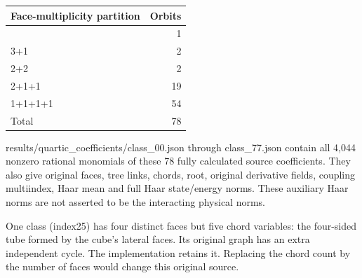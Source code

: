 \documentclass[11pt,a4paper]{article}
\newcounter{none}
\renewcommand{\[}{\begingroup\small\originaldisplaystart}
\renewcommand{\]}{\originaldisplayend\endgroup}
\begin{document}
{\def\LTcaptype{none} %
\begin{longtable}[]{@{}lr@{}}
\toprule\noalign{}
Face-multiplicity partition & Orbits \\
\midrule\noalign{}
\endhead
\bottomrule\noalign{}
\endlastfoot
4 & 1 \\
3+1 & 2 \\
2+2 & 2 \\
2+1+1 & 19 \\
1+1+1+1 & 54 \\
Total & 78 \\
\end{longtable}
}

{\ttfamily r\allowbreak{}e\allowbreak{}s\allowbreak{}u\allowbreak{}l\allowbreak{}t\allowbreak{}s\allowbreak{}/\allowbreak{}q\allowbreak{}u\allowbreak{}a\allowbreak{}r\allowbreak{}t\allowbreak{}i\allowbreak{}c\allowbreak{}\_\allowbreak{}c\allowbreak{}o\allowbreak{}e\allowbreak{}f\allowbreak{}f\allowbreak{}i\allowbreak{}c\allowbreak{}i\allowbreak{}e\allowbreak{}n\allowbreak{}t\allowbreak{}s\allowbreak{}/\allowbreak{}c\allowbreak{}l\allowbreak{}a\allowbreak{}s\allowbreak{}s\allowbreak{}\_\allowbreak{}0\allowbreak{}0\allowbreak{}.\allowbreak{}j\allowbreak{}s\allowbreak{}o\allowbreak{}n\allowbreak{}}
through
{\ttfamily c\allowbreak{}l\allowbreak{}a\allowbreak{}s\allowbreak{}s\allowbreak{}\_\allowbreak{}7\allowbreak{}7\allowbreak{}.\allowbreak{}j\allowbreak{}s\allowbreak{}o\allowbreak{}n\allowbreak{}}
contain all 4,044 nonzero rational monomials of these 78 fully
calculated source coefficients. They also give original faces, tree
links, chords, root, original derivative fields, coupling multiindex,
Haar mean and full Haar state/energy norms. These auxiliary Haar norms
are not asserted to be the interacting physical norms.

One class (index25) has four distinct faces but five chord variables:
the four-sided tube formed by the cube's lateral faces. Its original
graph has an extra independent cycle. The implementation retains it.
Replacing the chord count by the number of faces would change this
original source.
\end{document}
